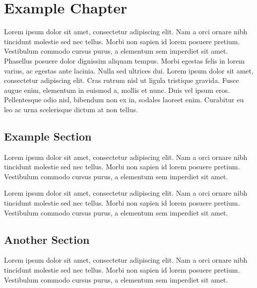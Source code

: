 \chapter{Example Chapter}

Lorem ipsum dolor sit amet, consectetur adipiscing elit. Nam a orci ornare nibh tincidunt molestie sed nec tellus. Morbi non sapien id lorem posuere pretium. Vestibulum commodo cursus purus, a elementum sem imperdiet sit amet. Phasellus posuere dolor dignissim aliquam tempus. Morbi egestas felis in lorem varius, ac egestas ante lacinia. Nulla sed ultrices dui. Lorem ipsum dolor sit amet, consectetur adipiscing elit. Cras rutrum nisl ut ligula tristique gravida. Fusce augue enim, elementum in euismod a, mollis et nunc. Duis vel ipsum eros. Pellentesque odio nisl, bibendum non ex in, sodales laoreet enim. Curabitur eu leo ac urna scelerisque dictum at non tellus.

\section{Example Section}

Lorem ipsum dolor sit amet, consectetur adipiscing elit. Nam a orci ornare nibh tincidunt molestie sed nec tellus. Morbi non sapien id lorem posuere pretium. Vestibulum commodo cursus purus, a elementum sem imperdiet sit amet.

Lorem ipsum dolor sit amet, consectetur adipiscing elit. Nam a orci ornare nibh tincidunt molestie sed nec tellus. Morbi non sapien id lorem posuere pretium. Vestibulum commodo cursus purus, a elementum sem imperdiet sit amet.

\section{Another Section}

Lorem ipsum dolor sit amet, consectetur adipiscing elit. Nam a orci ornare nibh tincidunt molestie sed nec tellus. Morbi non sapien id lorem posuere pretium. Vestibulum commodo cursus purus, a elementum sem imperdiet sit amet.
